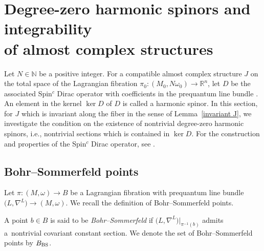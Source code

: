 \documentclass[pdftex]{sigma}
\numberwithin{equation}{section}
\newcommand{\R}{\mathbb{R}}
\newcommand{\N}{\mathbb{N}}
\begin{document}
\section[Degree-zero harmonic spinors and integrability of almost complex structures]{Degree-zero harmonic spinors and integrability\\ of almost complex structures}\label{equiv quantization}
Let $N\in \N$ be a positive integer. For a compatible almost complex structure $J$ on the total space of the Lagrangian fibration $\pi_0\colon (M_0,N\omega_0)\to \R^n$, let $D$ be the associated Spin${}^c$ Dirac operator with coefficients in the prequantum line bundle . An element in the kernel $\ker D$ of $D$ is called a harmonic spinor. In this section, for $J$ which is invariant along the fiber in the sense of Lemma~\ref{invariant J}, we investigate the condition on the existence of nontrivial degree-zero harmonic spinors, i.e., nontrivial sections which is contained in $\ker D$. For the construction and properties of the Spin${}^c$ Dirac operator, see \cite{MR1365745, LM}.


\subsection{Bohr--Sommerfeld points}
Let $\pi\colon (M,\omega)\to B$ be a Lagrangian fibration with prequantum line bundle $\bigl(L,\nabla^L\bigr)\to (M,\omega)$. We recall the definition of Bohr--Sommerfeld points.
\begin{Definition}
A point $b\in B$ is said to be \emph{Bohr--Sommerfeld} if $\bigl(L,\nabla^L\bigr)|_{\pi^{-1}(b)}$ admits a~nontrivial covariant constant section. We denote the set of Bohr--Sommerfeld points by $B_{\rm BS}$.
\end{Definition}
\end{document}
